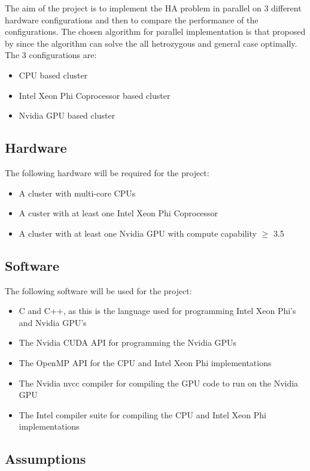 \documentclass[10pt,twocolumn]{witseiepaper}
\begin{document}
The aim of the project is to implement the HA problem in parallel on 3 different hardware configurations and 
then to compare the performance of the configurations. The chosen algorithm for parallel implementation is 
that proposed by \cite{chen:2013} since the algorithm can solve the all hetrozygous and general case optimally. 
The 3 configurations are:
\begin{itemize}
    \item{CPU based cluster}
    \item{Intel Xeon Phi Coprocessor based cluster}
    \item{Nvidia GPU based cluster}
\end{itemize}

\subsection{Hardware} \label{ssec:hware}

The following hardware will be required for the project:
\begin{itemize}
    \item{A cluster with multi-core CPUs}
    \item{A custer with at least one Intel Xeon Phi Coprocessor}
    \item{A cluster with at least one Nvidia GPU with compute capability $\ge$ 3.5}
\end{itemize}

\subsection{Software} \label{ssec:sware}

The following software will be used for the project:
\begin{itemize}
    \item{C and C++, as this is the language used for programming Intel Xeon Phi's and Nvidia GPU's}
    \item{The Nvidia CUDA API for programming the Nvidia GPUs}
    \item{The OpenMP API for the CPU and Intel Xeon Phi implementations}
    \item{The Nvidia nvcc compiler for compiling the GPU code to run on the Nvidia GPU}
    \item{The Intel compiler suite for compiling the CPU and Intel Xeon Phi implementations}
\end{itemize}

\subsection{Assumptions}
\end{document}
